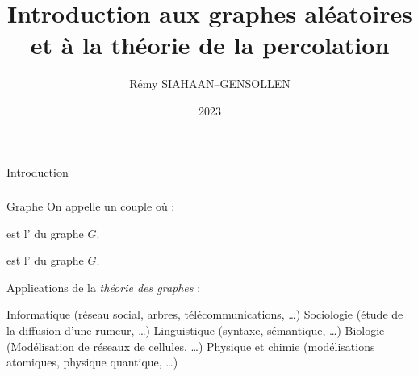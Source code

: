 \documentclass[french,bookmarks]{beamer}
\title{Introduction aux graphes aléatoires et à la théorie de la percolation}
\author{Rémy SIAHAAN--GENSOLLEN}
\institute{Janson-de-Sailly, MPI/MPI*}
\date{2023}
\newcommand{\bcP}{\mathcal{P}}
\begin{document}
\frame{\titlepage}

\begin{frame}{Introduction}

    \frametitle{}

    \begin{bdefinition}{Graphe}{}
        On appelle  un couple  où \hg{$E \subset \bcP_2\p{V}$} :
        \begin{enumerate}
            \itast {} est l' du graphe $G$.
            
            \itast {} est l' du graphe $G$.
        \end{enumerate}
    \end{bdefinition}
    
    \pause
    
    Applications de la \emph{théorie des graphes} :
    \begin{enumerate}
        \itt Informatique (réseau social, arbres, télécommunications, \dots)\pause
        \itt Sociologie (étude de la diffusion d'une rumeur, \dots)\pause
        \itt Linguistique (syntaxe, sémantique, \dots)\pause
        \itt Biologie (Modélisation de réseaux de cellules, \dots)\pause
        \itt Physique et chimie (modélisations atomiques, physique quantique, \dots)
    \end{enumerate}
\end{frame}
\end{document}
